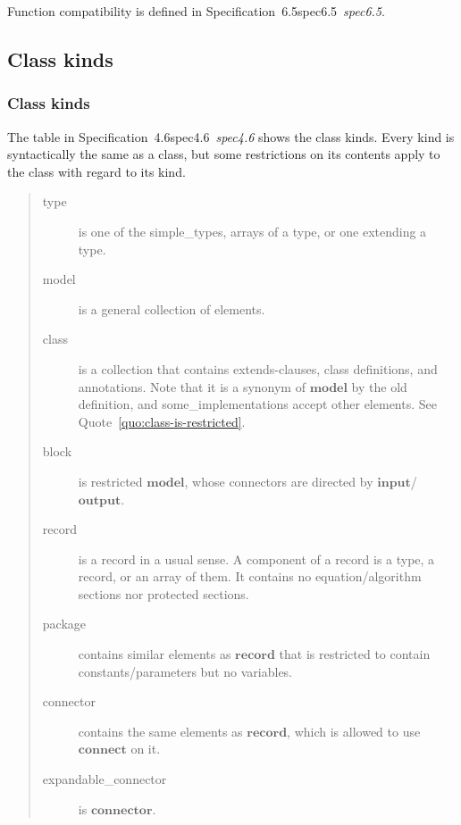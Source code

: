 \documentclass[10pt,b5paper]{article}
\def\specrefx#1#2{Specification~#1\ifx\relax#2\relax{}\else~{\it{}#2}\fi}
\def\specref#1{\specrefx{#1}{\csname spec#1\endcsname}}
\begin{document}
Function compatibility is defined in \specref{6.5}.


\subsection{Class kinds}

\subsubsection*{Class kinds}\label{sec:class-kinds}

The table in \specref{4.6}\/ shows the class kinds.  Every kind is
syntactically the same as a class, but some restrictions on its
contents apply to the class with regard to its kind.

\begin{quote}
\begin{description}

\item[type] is one of the simple_types, arrays of a type, or one
extending a type.

\item[model] is a general collection of elements.

\item[class] is a collection that contains extends-clauses, class
definitions, and annotations.  Note that it is a synonym of
$\mathbf{model}$ by the old definition, and some_implementations
accept other elements.  See Quote~\ref{quo:class-is-restricted}.

\item[block] is restricted $\mathbf{model}$, whose connectors are
directed by $\mathbf{input}$/$\mathbf{output}$.

\item[record] is a record in a usual sense.  A component of a record
is a type, a record, or an array of them.  It contains no
equation/algorithm sections nor protected sections.

\item[package] contains similar elements as $\mathbf{record}$ that is
restricted to contain constants/parameters but no variables.

\item[connector] contains the same elements as $\mathbf{record}$,
which is allowed to use $\mathbf{connect}$ on it.

\item[expandable_connector] is $\mathbf{connector}$.


\end{description}
\end{quote}
\end{document}
